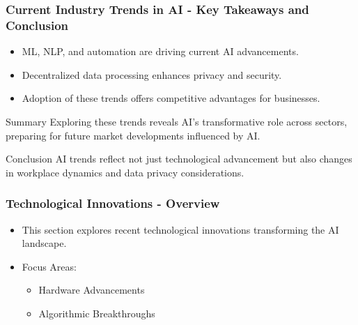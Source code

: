 \documentclass{beamer}
\begin{document}
\begin{frame}[fragile]
    \frametitle{Current Industry Trends in AI - Key Takeaways and Conclusion}
    \begin{itemize}
        \item ML, NLP, and automation are driving current AI advancements.
        \item Decentralized data processing enhances privacy and security.
        \item Adoption of these trends offers competitive advantages for businesses.
    \end{itemize}
    
    \begin{block}{Summary}
        Exploring these trends reveals AI's transformative role across sectors, preparing for future market developments influenced by AI.
    \end{block}
    
    \begin{block}{Conclusion}
        AI trends reflect not just technological advancement but also changes in workplace dynamics and data privacy considerations.
    \end{block}
\end{frame}

\begin{frame}[fragile]
    \frametitle{Technological Innovations - Overview}
    \begin{itemize}
        \item This section explores recent technological innovations transforming the AI landscape.
        \item Focus Areas:
        \begin{itemize}
            \item Hardware Advancements
            \item Algorithmic Breakthroughs
        \end{itemize}
    \end{itemize}
\end{frame}
\end{document}
